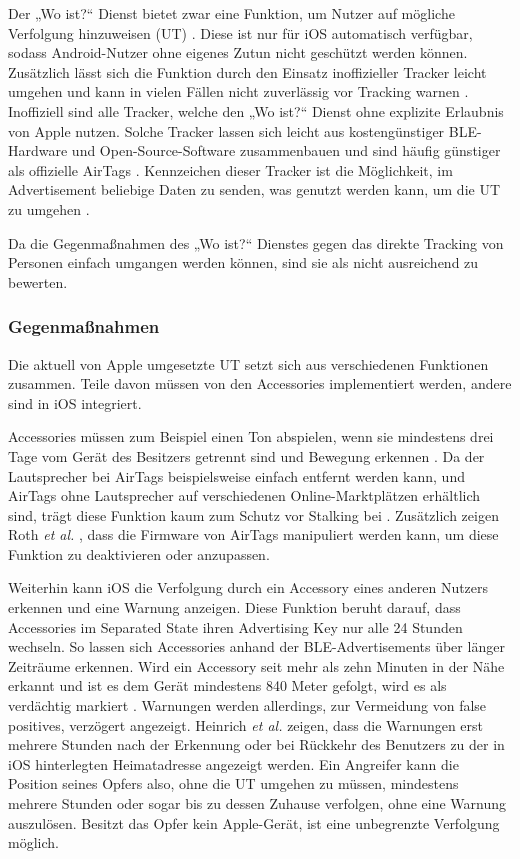 Der „Wo ist?“ Dienst bietet zwar eine Funktion, um Nutzer auf mögliche Verfolgung hinzuweisen (\ac{UT}) \cite{Apple_FindMySpec}.
Diese ist nur für iOS automatisch verfügbar, sodass Android-Nutzer ohne eigenes Zutun nicht geschützt werden können.
Zusätzlich lässt sich die Funktion durch den Einsatz inoffizieller Tracker leicht umgehen und kann in vielen Fällen nicht zuverlässig vor Tracking warnen \cite{Heinrich_AirGuard,Mayberry_Tracking}.
Inoffiziell sind alle Tracker, welche den „Wo ist?“ Dienst ohne explizite Erlaubnis von Apple nutzen.
Solche Tracker lassen sich leicht aus kostengünstiger \ac{BLE}-Hardware und Open-Source-Software zusammenbauen und sind häufig günstiger als offizielle AirTags \cite{Heinrich_OpenHaystack,Mayberry_Tracking}.
Kennzeichen dieser Tracker ist die Möglichkeit, im Advertisement beliebige Daten zu senden, was genutzt werden kann, um die \ac{UT} zu umgehen \cite{Mayberry_Tracking}.

Da die Gegenmaßnahmen des „Wo ist?“ Dienstes gegen das direkte Tracking von Personen einfach umgangen werden können, sind sie als nicht ausreichend zu bewerten.

\subsubsection{Gegenmaßnahmen}

Die aktuell von Apple umgesetzte \ac{UT} setzt sich aus verschiedenen Funktionen zusammen.
Teile davon müssen von den Accessories implementiert werden, andere sind in iOS integriert.

Accessories müssen zum Beispiel einen Ton abspielen, wenn sie mindestens drei Tage vom Gerät des Besitzers getrennt sind und Bewegung erkennen \cite{Apple_FindMySpec}.
Da der Lautsprecher bei AirTags beispielsweise einfach entfernt werden kann, und AirTags ohne Lautsprecher auf verschiedenen Online-Marktplätzen erhältlich sind, trägt diese Funktion kaum zum Schutz vor Stalking bei \cite{Heinrich_AirGuard}.
Zusätzlich zeigen Roth \textit{et al.} \cite{Roth_airtags}, dass die Firmware von AirTags manipuliert werden kann, um diese Funktion zu deaktivieren oder anzupassen.

Weiterhin kann iOS die Verfolgung durch ein Accessory eines anderen Nutzers erkennen und eine Warnung anzeigen.
Diese Funktion beruht darauf, dass Accessories im Separated State ihren Advertising Key nur alle 24 Stunden wechseln.
So lassen sich Accessories anhand der \ac{BLE}-Advertisements über länger Zeiträume erkennen.
Wird ein Accessory seit mehr als zehn Minuten in der Nähe erkannt und ist es dem Gerät mindestens 840 Meter gefolgt, wird es als verdächtig markiert \cite{Heinrich_AirGuard}.
Warnungen werden allerdings, zur Vermeidung von false positives, verzögert angezeigt.
Heinrich \textit{et al.} \cite{Heinrich_AirGuard} zeigen, dass die Warnungen erst mehrere Stunden nach der Erkennung oder bei Rückkehr des Benutzers zu der in iOS hinterlegten Heimatadresse angezeigt werden.
Ein Angreifer kann die Position seines Opfers also, ohne die \ac{UT} umgehen zu müssen, mindestens mehrere Stunden oder sogar bis zu dessen Zuhause verfolgen, ohne eine Warnung auszulösen.
Besitzt das Opfer kein Apple-Gerät, ist eine unbegrenzte Verfolgung möglich.

